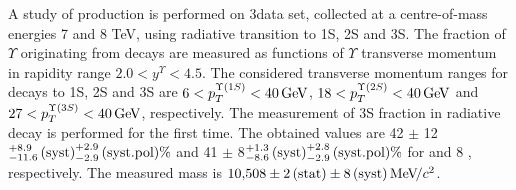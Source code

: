 A study of \chib production is performed on 3\invfb data set, collected
at a centre-of-mass energies 7 and 8 TeV, using \chib radiative transition to
\Y1S, \Y2S and \Y3S. The fraction of $\Upsilon$ originating from \chib decays
are measured as functions of $\Upsilon$ transverse momentum
in rapidity range $2.0 < y^{\Upsilon} < 4.5$. The considered transverse momentum
ranges for decays to \Y1S, \Y2S and \Y3S are $6<p_T^{\Y1S}<40\gev$,
$18<p_T^{\Y2S}<40\gev$ and $27<p_T^{\Y3S}<40\gev$, respectively. The measurement of
\Y3S fraction in radiative \chibThreeP decay is performed for the first time.
The obtained values are 42 $\pm$
12\stat${}^{+8.9}_{-11.6}\mathrm{\,(syst)}^{+2.9}_{-2.9}\mathrm{\,(syst.pol)} \%$ and 41 $\pm$
8\stat${}^{+1.3}_{-8.6}\mathrm{\,(syst)}^{+2.8}_{-2.9}\mathrm{\,(syst.pol)} \%$ for  and 8 \tev,
respectively. The measured \chiboneThreeP mass is $10{,}508 \pm 2\mathrm{\,(stat)} \pm
8\mathrm{\,(syst)} {\mathrm{\,Me\kern -0.1em V\!/}c^2}$.

